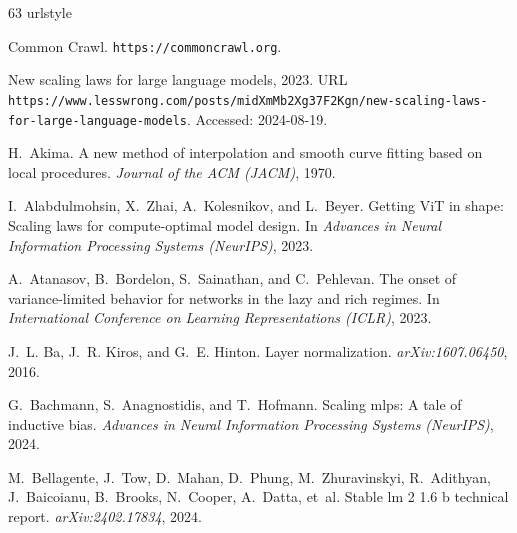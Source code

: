 \documentclass{article}
\theoremstyle{plain}
\theoremstyle{definition}
\theoremstyle{remark}
\begin{document}
%
\begin{thebibliography}{63}
\providecommand{\natexlab}[1]{#1}
\providecommand{\url}[1]{\texttt{#1}}
\expandafter\ifx\csname urlstyle\endcsname\relax
  \providecommand{\doi}[1]{doi: #1}\else
  \providecommand{\doi}{doi: \begingroup \urlstyle{rm}\Url}\fi

{Common Crawl}.
\newblock \url{https://commoncrawl.org}.

New scaling laws for large language models, 2023.
\newblock URL \url{https://www.lesswrong.com/posts/midXmMb2Xg37F2Kgn/new-scaling-laws-for-large-language-models}.
\newblock Accessed: 2024-08-19.

H.~Akima.
\newblock A new method of interpolation and smooth curve fitting based on local procedures.
\newblock \emph{Journal of the ACM (JACM)}, 1970.

I.~Alabdulmohsin, X.~Zhai, A.~Kolesnikov, and L.~Beyer.
\newblock Getting {V}i{T} in shape: Scaling laws for compute-optimal model design.
\newblock In \emph{Advances in Neural Information Processing Systems (NeurIPS)}, 2023.

A.~Atanasov, B.~Bordelon, S.~Sainathan, and C.~Pehlevan.
\newblock The onset of variance-limited behavior for networks in the lazy and rich regimes.
\newblock In \emph{International Conference on Learning Representations (ICLR)}, 2023.

J.~L. Ba, J.~R. Kiros, and G.~E. Hinton.
\newblock Layer normalization.
\newblock \emph{arXiv:1607.06450}, 2016.

G.~Bachmann, S.~Anagnostidis, and T.~Hofmann.
\newblock Scaling mlps: A tale of inductive bias.
\newblock \emph{Advances in Neural Information Processing Systems (NeurIPS)}, 2024.

M.~Bellagente, J.~Tow, D.~Mahan, D.~Phung, M.~Zhuravinskyi, R.~Adithyan, J.~Baicoianu, B.~Brooks, N.~Cooper, A.~Datta, et~al.
\newblock Stable lm 2 1.6 b technical report.
\newblock \emph{arXiv:2402.17834}, 2024.


\end{thebibliography}
\end{document}
